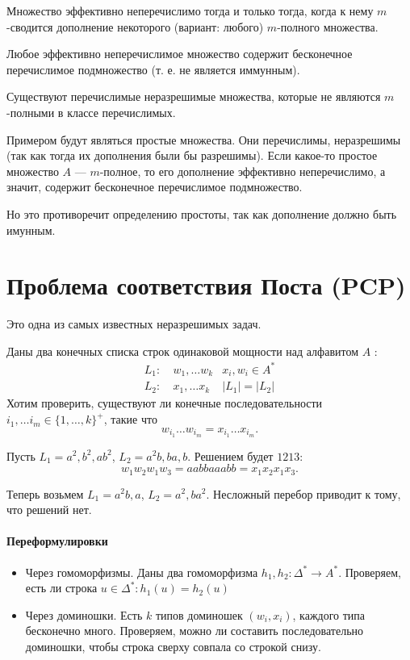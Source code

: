 \begin{thm}
    Множество эффективно неперечислимо тогда и только тогда, когда к нему $m$-сводится дополнение некоторого (вариант: любого) $m$-полного множества.
\end{thm}
\begin{thm}
    Любое эффективно неперечислимое множество содержит бесконечное перечислимое подмножество (т. е. не является иммунным).
\end{thm}
\begin{st}
	Существуют перечислимые неразрешимые множества, которые не являются $ m$-полными в классе перечислимых.
\end{st}
\begin{proof*}
    Примером будут являться простые множества. Они перечислимы, неразрешимы (так как тогда их дополнения были бы разрешимы). Если какое-то простое множество $A$ --- $m$-полное, то его дополнение эффективно неперечислимо, а значит, содержит бесконечное перечислимое подмножество. 

	Но это противоречит определению простоты, так как дополнение должно быть имунным.
\end{proof*}


\section{Проблема соответствия Поста (PCP)}
Это одна из самых известных неразрешимых задач.

Даны два конечных списка строк одинаковой мощности над алфавитом $ A$ :
\[
\begin{aligned}
	L_1 :& ~w_1, \ldots w_k & x_i, w_i \in A^{*} \\
	L_2: & ~x_1, \ldots x_k & \lvert L_1 \rvert = \lvert L_2 \rvert  
\end{aligned}
\]
Хотим проверить, существуют ли конечные последовательности $  i_1, \ldots i_m \in \{1, \ldots , k\}^+$, такие что $$ w_{i_1}\ldots w_{i_m} = x_{i_1}\ldots x_{i_m}.$$


\begin{ex}
    Пусть $  L_1 = a^2, b^2, ab ^2$, $  L_2 = a^2b, ba, b$. Решением будет $ 1213$:
	 \[
	w_1 w_2 w_1 w_3 = aabbaaabb = x_1x_2x_1x_3
	.\] 
\end{ex}
\begin{ex}
    Теперь возьмем  $  L_1 = a^2b, a$, $  L_2 = a^2, ba^2$. Несложный перебор приводит к тому, что решений нет.
\end{ex}

\paragraph{Переформулировки}
\begin{itemize}
	\item Через гомоморфизмы. Даны два гомоморфизма $ h_1, h_2\colon \Delta^{*} \to A^{*}$. Проверяем, есть ли строка $ u \in \Delta^{*}\colon h_1(u) = h_2(u)$ 
	\item Через доминошки. Есть $ k$ типов доминошек $ (w_i, x_i)$, каждого типа бесконечно много. Проверяем, можно ли составить последовательно доминошки, чтобы строка сверху совпала со строкой снизу.
\end{itemize}


